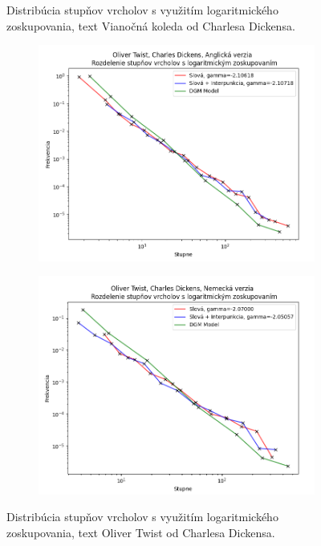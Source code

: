 \begin{figure}[htbp]
    \vspace{0.3cm}
    \caption{Distribúcia stupňov vrcholov s využitím logaritmického zoskupovania, text Vianočná koleda od Charlesa Dickensa.}\label{fig:lbdegdistKoleda}
\end{figure}

\begin{figure}[htbp]
    \centering
    \begin{subfigure}[b]{0.9\textwidth}
        \includegraphics[width=\textwidth]{images/lbdegdist/Screenshot_5.png}
    \end{subfigure}

    \vspace{0.3cm}

    \begin{subfigure}[b]{0.9\textwidth}
        \includegraphics[width=\textwidth]{images/lbdegdist/Screenshot_6.png}
    \end{subfigure}
    
    \vspace{0.3cm}
    \caption{Distribúcia stupňov vrcholov s využitím logaritmického zoskupovania, text Oliver Twist od Charlesa Dickensa.}\label{fig:lbdegdistTwist}
\end{figure}

